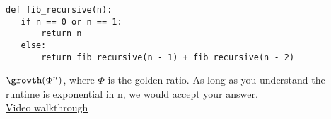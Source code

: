 \begin{blocksection}
\question
\begin{lstlisting}
def fib_recursive(n):
   if n == 0 or n == 1:
       return n
   else:
       return fib_recursive(n - 1) + fib_recursive(n - 2)
\end{lstlisting}
\begin{solution}[0.0in]
   $\growth(\Phi^n)$, where $\Phi$ is the golden ratio. As long as you
   understand the runtime is exponential in n, we would accept your answer.\\
\href{https://www.youtube.com/watch?v=XsdTV6cAAjY&vq=hd1080&t=30m10s}{Video walkthrough}
\end{solution}
\end{blocksection}
